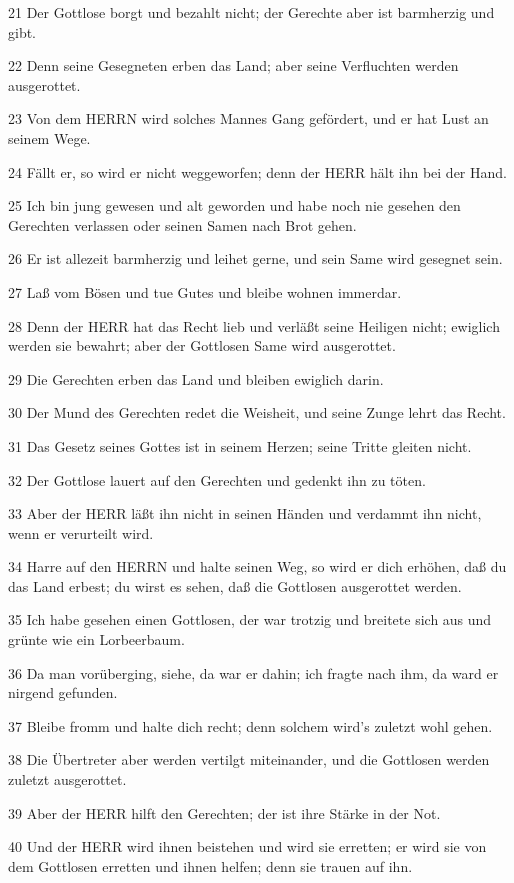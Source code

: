 \par 21 Der Gottlose borgt und bezahlt nicht; der Gerechte aber ist barmherzig und gibt.
\par 22 Denn seine Gesegneten erben das Land; aber seine Verfluchten werden ausgerottet.
\par 23 Von dem HERRN wird solches Mannes Gang gefördert, und er hat Lust an seinem Wege.
\par 24 Fällt er, so wird er nicht weggeworfen; denn der HERR hält ihn bei der Hand.
\par 25 Ich bin jung gewesen und alt geworden und habe noch nie gesehen den Gerechten verlassen oder seinen Samen nach Brot gehen.
\par 26 Er ist allezeit barmherzig und leihet gerne, und sein Same wird gesegnet sein.
\par 27 Laß vom Bösen und tue Gutes und bleibe wohnen immerdar.
\par 28 Denn der HERR hat das Recht lieb und verläßt seine Heiligen nicht; ewiglich werden sie bewahrt; aber der Gottlosen Same wird ausgerottet.
\par 29 Die Gerechten erben das Land und bleiben ewiglich darin.
\par 30 Der Mund des Gerechten redet die Weisheit, und seine Zunge lehrt das Recht.
\par 31 Das Gesetz seines Gottes ist in seinem Herzen; seine Tritte gleiten nicht.
\par 32 Der Gottlose lauert auf den Gerechten und gedenkt ihn zu töten.
\par 33 Aber der HERR läßt ihn nicht in seinen Händen und verdammt ihn nicht, wenn er verurteilt wird.
\par 34 Harre auf den HERRN und halte seinen Weg, so wird er dich erhöhen, daß du das Land erbest; du wirst es sehen, daß die Gottlosen ausgerottet werden.
\par 35 Ich habe gesehen einen Gottlosen, der war trotzig und breitete sich aus und grünte wie ein Lorbeerbaum.
\par 36 Da man vorüberging, siehe, da war er dahin; ich fragte nach ihm, da ward er nirgend gefunden.
\par 37 Bleibe fromm und halte dich recht; denn solchem wird's zuletzt wohl gehen.
\par 38 Die Übertreter aber werden vertilgt miteinander, und die Gottlosen werden zuletzt ausgerottet.
\par 39 Aber der HERR hilft den Gerechten; der ist ihre Stärke in der Not.
\par 40 Und der HERR wird ihnen beistehen und wird sie erretten; er wird sie von dem Gottlosen erretten und ihnen helfen; denn sie trauen auf ihn.

